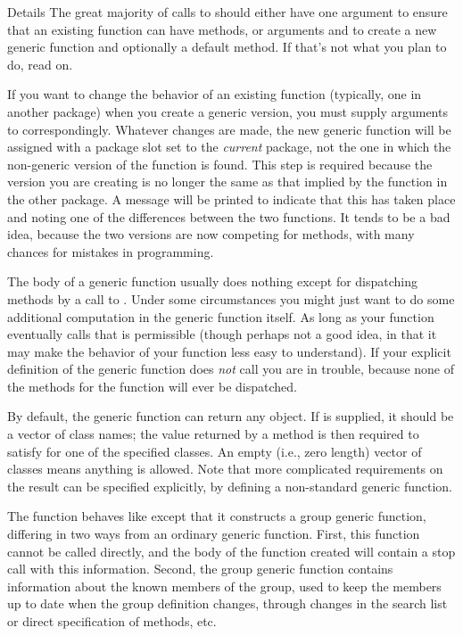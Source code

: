 \begin{Section}{Details}
The great majority of calls to  should either
have one argument to ensure that an existing function can have
methods, or arguments  and  to create a new
generic function and optionally a default method.  If that's not
what you plan to do, read on.

If you want to change the behavior of an existing function (typically,
one in another package) when you create a generic version, you must
supply arguments to  correspondingly.  Whatever
changes are made, the new generic function will be assigned with a
package slot set to the \emph{current} package, not the one in which
the non-generic version of the function is found.  This step is
required because the version you are creating is no longer the same as
that implied by the function in the other package.  A message will be
printed to indicate that this has taken place and noting one of the
differences between the two functions.  It tends to be a bad idea,
because the two versions are now competing for methods, with many
chances for mistakes in programming.

The body of a generic function usually does nothing except for
dispatching methods by a call to .  Under some
circumstances you might just want to do some additional computation in
the generic function itself.  As long as your function eventually
calls  that is permissible (though perhaps not a
good idea, in that it may make the behavior of your function less easy
to understand).  If your explicit definition of the generic function
does \emph{not} call  you are in trouble,
because none of the methods for the function will ever be dispatched.

By default, the generic function can return any object.  If
 is supplied, it should be a vector of class names;
the value returned by a method is then required to satisfy
 for one of the specified classes.  An empty
(i.e., zero length) vector of classes means anything is allowed.  Note
that more complicated requirements on the result can be specified
explicitly, by defining a non-standard generic function.

The  function behaves like 
except that it constructs a group generic function, differing in two
ways from an ordinary generic function.  First, this function cannot
be called directly, and the body of the function created will contain
a stop call with this information.  Second, the group generic function
contains information about the known members of the group, used to
keep the members up to date when the group definition changes, through
changes in the search list or direct specification of methods, etc.
\end{Section}
